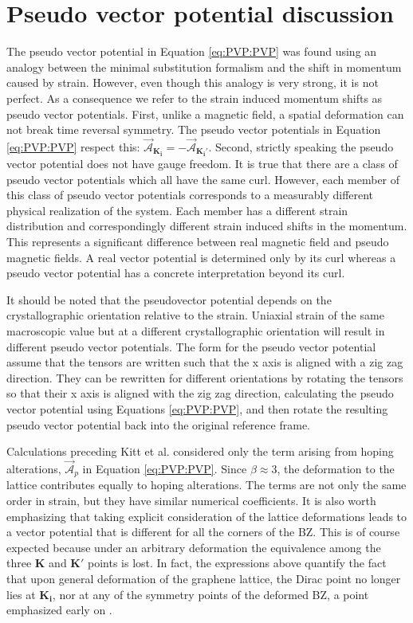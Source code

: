 \section{Pseudo vector potential discussion}
The pseudo vector potential in Equation \ref{eq:PVP:PVP} was found using an analogy between the minimal substitution formalism and the shift in momentum caused by strain.
However, even though this analogy is very strong, it is not perfect.
As a consequence we refer to the strain induced momentum shifts as pseudo vector potentials.
First, unlike a magnetic field, a spatial deformation can not break time reversal symmetry.
The pseudo vector potentials in Equation \ref{eq:PVP:PVP} respect this: $\vec{\mathcal{A}}_{\bm{K_i}} = - \vec{\mathcal{A}}_{\bm{K_i'}}$.
Second, strictly speaking the pseudo vector potential does not have gauge freedom.
It is true that there are a class of pseudo vector potentials which all have the same curl.
However, each member of this class of pseudo vector potentials corresponds to a measurably different physical realization of the system.
Each member has a different strain distribution and correspondingly different strain induced shifts in the momentum.
This represents a significant difference between real magnetic field and pseudo magnetic fields.
A real vector potential is determined only by its curl whereas a pseudo vector potential has a concrete interpretation beyond its curl.

It should be noted that the pseudovector potential depends on the crystallographic orientation relative to the strain.
Uniaxial strain of the same macroscopic value but at a different crystallographic orientation will result in different pseudo vector potentials.
The form for the pseudo vector potential assume that the tensors are written such that the x axis is aligned with a zig zag direction.
They can be rewritten for different orientations by rotating the tensors so that their x axis is aligned with the zig zag direction, calculating the pseudo vector potential using Equations \ref{eq:PVP:PVP}, and then rotate the resulting pseudo vector potential back into the original reference frame.

Calculations preceding Kitt et al. \cite{Kitt2012} considered only the term arising from hoping alterations, $\vec{\mathcal{A}}_p$ in Equation \ref{eq:PVP:PVP}.
Since $\beta \approx 3$, the deformation to the lattice contributes equally to hoping alterations.
The terms are not only the same order in strain, but they have similar numerical coefficients.
It is also worth emphasizing that taking explicit consideration of the lattice deformations leads to a vector potential that is different for all the corners of the BZ.
This is of course expected because under an arbitrary deformation the equivalence among the three $\bm{K}$ and $\bm{K'}$ points is lost.
In fact, the expressions above quantify the fact that upon general deformation of the graphene lattice, the Dirac point no longer lies at $\bm{K_i}$, nor at any of the symmetry points of the deformed BZ, a point emphasized early on \cite{Pereira2009}.

